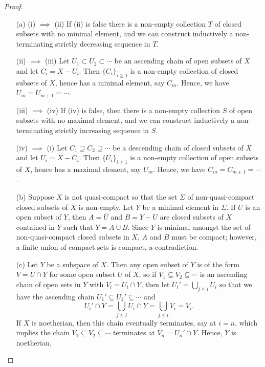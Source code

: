 \documentclass[12pt]{article}
\theoremstyle{definition}
\begin{document}
\begin{enumerate} [label=\textbf{\arabic*.}, leftmargin=-0.05em]
\begin{proof} $ $ \vspace{0pt}
   \begin{itemize}
    \item[(a)] (i) $\implies$ (ii) If (ii) is false there is a non-empty collection $T$ of closed subsets with no minimal element, and we can construct inductively a non-terminating strictly decreasing sequence in $T$.

    (ii) $\implies$ (iii) Let $U_1 \subset U_2 \subset \cdots$ be an ascending chain of open subsets of $X$ and let $C_i = X - U_i$. Then $\{ C_i \}_{i \geq 1}$ is a non-empty collection of closed subsets of $X$, hence has a minimal element, say $C_m$. Hence, we have $U_m = U_{m + 1} = \cdots$.

    (iii) $\implies$ (iv) If (iv) is false, then there is a non-empty collection $S$ of open subsets with no maximal element, and we can construct inductively a non-terminating strictly increasing sequence in $S$.

    (iv) $\implies$ (i) Let $C_1 \supseteq C_2 \supseteq \cdots$ be a descending chain of closed subsets of $X$ and let $U_i = X - C_i$. Then $\{ U_i \}_{i \geq 1}$ is a non-empty collection of open subsets of $X$, hence has a maximal element, say $U_m$. Hence, we have $C_m = C_{m + 1} = \cdots$.

    \item[(b)] Suppose $X$ is not quasi-compact so that the set $\Sigma$ of non-quasi-compact closed subsets of $X$ is non-empty. Let $Y$ be a minimal element in $\Sigma$. If $U$ is an open subset of $Y$, then $A = \overline{U}$ and $B = Y - U$  are closed subsets of $X$ contained in $Y$ such that $Y = A \cup B$. Since $Y$ is minimal amongst the set of non-quasi-compact closed subsets in $X$,  $A$ and $B$ must be compact; however, a finite union of compact sets is compact, a contradiction.

    \item[(c)] Let $Y$ be a subspace of $X$. Then any open subset of $Y$ is of the form $V = U \cap Y$ for some open subset $U$ of $X$, so if $V_1 \subseteq V_2 \subseteq \cdots$ is an ascending chain of open sets in $Y$ with $V_i = U_i \cap Y$, then let $U_i' = \bigcup_{j \leq i} U_i$ so that we have the ascending chain $U_1' \subseteq U_2' \subseteq \cdots$ and
    \begin{equation*}
         U_i' \cap Y = \bigcup_{j \leq i} U_i \cap Y = \bigcup_{j \leq i} V_i = V_i.
    \end{equation*}
    If $X$ is noetherian, then this chain eventually terminates, say at $i = n$, which implies the chain $V_1 \subseteq V_2 \subseteq \cdots$ terminates at $V_n = U_n' \cap Y$. Hence, $Y$ is noetherian.


\end{itemize}
\end{proof}
\end{enumerate}
\end{document}
